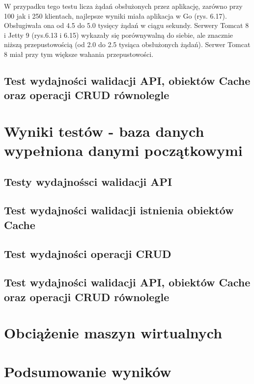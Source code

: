 W przypadku tego testu licza żądań obsłużonych przez aplikację, zarówno przy 100 jak i 250 klientach, najlepsze wyniki miała aplikacja w Go (rys. 6.17). Obsługiwała ona od 4.5 do 5.0 tysięcy żądań w ciągu sekundy. Serwery Tomcat 8 i Jetty 9 (rys.6.13 i 6.15) wykazały się porównywalną do siebie, ale znacznie niższą przepustowością (od 2.0 do 2.5 tysiąca obsłużonych żądań). Serwer Tomcat 8 miał przy tym  większe wahania przepustowości.


\clearpage

\subsection{Test wydajności walidacji API, obiektów Cache oraz operacji CRUD równolegle}
% 
\clearpage

\newpage
\section{Wyniki testów - baza danych wypełniona danymi początkowymi}
\subsection{Testy wydajnośsci walidacji API}
% 
\clearpage

\subsection{Test wydajności walidacji istnienia obiektów Cache}
% 
\clearpage

\subsection{Test wydajności operacji CRUD}
% 
\clearpage

\subsection{Test wydajności walidacji API, obiektów Cache oraz operacji CRUD równolegle }
% 
\clearpage

\section{Obciążenie maszyn wirtualnych}

\newpage
\section{Podsumowanie wyników}
